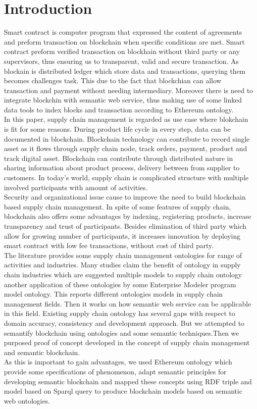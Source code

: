 \section{Introduction}
Smart contract is computer program that expressed the content of agreements and preform transaction on blockchain when specific conditions are met. Smart contract preform verified transaction on blockhain without third party or any supervisors, thus ensuring us to transparent, valid and secure transaction.
As blockain is distributed ledger which store data and transactions, querying them becomes challenges task. This due to the fact that blockchian can allow transaction and payment without needing intermediary.
Moreover there is need to integrate blockchin with semantic web service, thus making use of some linked data tools to index blocks and transaction according to Ethereum ontology.  \\
In this paper, supply chain management is regarded as use case where blokchain is fit for some reasons. 
During product life cycle in every step, data can be documented in blockchain. Blockchain technology can contribute to record single asset as it flows through supply chain node, track orders, payment, product and track digital asset. Blockchain can contribute through distributed nature in sharing information about product process, delivery between from supplier to customers. In today's world, supply chain is complicated structure with multiple involved participants with amount of activities.\\
Security and organizational issue cause to improve the need to build blockchain based supply chain management. In spite of some features of supply chain, blockchain also offers some advantages by indexing, registering products, increase transparency and trust of participants. Besides elimination of third party which allow for growing number of participants, it increases innovation by deploying smart contract with low fee transactions, without cost of third party. \\
The literature provides some supply chain management ontologies for range of activities and industries. Many studies claim the benefit of ontology in supply chain industries which are suggested multiple models to supply chain ontology another application of these ontologies by some Enterprise Modeler program model ontology. This reports different ontologies models in supply chain management fields. Then it works on how semantic web service can be applicable in this field. Existing supply chain ontology has several gaps with respect to domain accuracy, consistency and development approach. But we attempted to semantify blockchain using ontologies and some semantic techniques.Then we purposed proof of concept developed in the concept of supply chain management and semantic blockchain.\\
As this is important to gain advantages, we used Ethereum ontology which provide some specifications of phenomenon, adapt semantic principles for developing semantic blockchain and mapped these concepts using RDF triple and model based on Sparql query to produce blockchain models based on semantic web ontologies.

